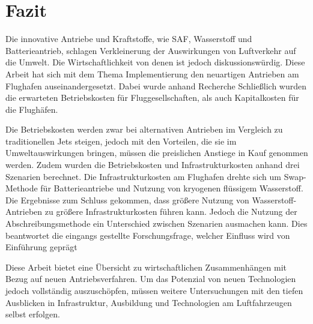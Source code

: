 \chapter{Fazit}
\label{ch:Fazit}
Die innovative Antriebe und Kraftstoffe, wie SAF, Wasserstoff und Batterieantrieb, schlagen Verkleinerung der Auswirkungen von Luftverkehr auf die Umwelt. 
Die Wirtschaftlichkeit von denen ist jedoch diskussionswürdig.
Diese Arbeit hat sich mit dem Thema Implementierung den neuartigen Antrieben am Flughafen auseinandergesetzt. Dabei wurde anhand Recherche 
Schließlich wurden die erwarteten Betriebskosten für Fluggesellschaften, als auch Kapitalkosten für die Flughäfen. 

Die Betriebskosten werden zwar bei alternativen Antrieben im Vergleich zu traditionellen Jets steigen, 
jedoch mit den Vorteilen, die sie im Umweltauswirkungen bringen, 
müssen die preislichen Anstiege in Kauf genommen werden. Zudem wurden die Betriebskosten und Infrastrukturkosten anhand drei Szenarien
berechnet. Die Infrastrukturkosten am Flughafen drehte sich um Swap-Methode für Batterieantriebe und Nutzung von kryogenen flüssigem Wasserstoff.
Die Ergebnisse zum Schluss gekommen, dass größere Nutzung von Wasserstoff-Antrieben zu größere Infrastrukturkosten führen kann.
Jedoch die Nutzung der Abschreibungsmethode ein Unterschied zwischen Szenarien ausmachen kann. Dies beantwortet die 
eingangs gestellte Forschungsfrage, welcher Einfluss wird von Einführung geprägt

Diese Arbeit bietet eine Übersicht zu wirtschaftlichen Zusammenhängen mit Bezug auf neuen Antriebsverfahren.
Um das Potenzial von neuen Technologien jedoch vollständig auszuschöpfen, müssen weitere Untersuchungen mit den tiefen Ausblicken
in Infrastruktur, Ausbildung und Technologien am Luftfahrzeugen selbst erfolgen.

